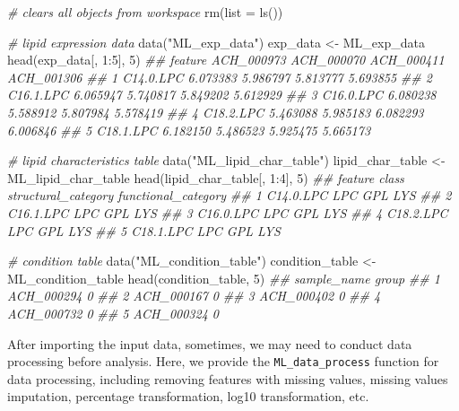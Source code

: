 \documentclass[]{article}
\newcommand{\hlnum}[1]{\textcolor[rgb]{0.816,0.125,0.439}{#1}}%
\newcommand{\hlstr}[1]{\textcolor[rgb]{0.251,0.627,0.251}{#1}}%
\newcommand{\hlcom}[1]{\textcolor[rgb]{0.502,0.502,0.502}{\textit{#1}}}%
\newcommand{\hlopt}[1]{\textcolor[rgb]{0,0,0}{#1}}%
\newcommand{\hlstd}[1]{\textcolor[rgb]{0.251,0.251,0.251}{#1}}%
\newcommand{\hlkwc}[1]{\textcolor[rgb]{0.251,0.251,0.251}{#1}}%
\newcommand{\hlkwd}[1]{\textcolor[rgb]{0.878,0.439,0.125}{#1}}%
\newenvironment{Shaded}{\begin{myshaded}}{\end{myshaded}}
\newcommand{\KeywordTok}[1]{\hlkwd{#1}}
\newcommand{\DataTypeTok}[1]{\hlkwc{#1}}
\newcommand{\DecValTok}[1]{\hlnum{#1}}
\newcommand{\StringTok}[1]{\hlstr{#1}}
\newcommand{\CommentTok}[1]{\hlcom{#1}}
\newcommand{\OperatorTok}[1]{\hlopt{#1}}
\newcommand{\NormalTok}[1]{\hlstd{#1}}
\begin{document}
\begin{Shaded}
\begin{Highlighting}[]
\CommentTok{# clears all objects from workspace}
\KeywordTok{rm}\NormalTok{(}\DataTypeTok{list =} \KeywordTok{ls}\NormalTok{())}

\CommentTok{# lipid expression data}
\KeywordTok{data}\NormalTok{(}\StringTok{"ML_exp_data"}\NormalTok{)}
\NormalTok{exp_data <-}\StringTok{ }\NormalTok{ML_exp_data}
\KeywordTok{head}\NormalTok{(exp_data[, }\DecValTok{1}\OperatorTok{:}\DecValTok{5}\NormalTok{], }\DecValTok{5}\NormalTok{)}
\CommentTok{##     feature ACH_000973 ACH_000070 ACH_000411 ACH_001306}
\CommentTok{## 1 C14.0.LPC   6.073383   5.986797   5.813777   5.693855}
\CommentTok{## 2 C16.1.LPC   6.065947   5.740817   5.849202   5.612929}
\CommentTok{## 3 C16.0.LPC   6.080238   5.588912   5.807984   5.578419}
\CommentTok{## 4 C18.2.LPC   5.463088   5.985183   6.082293   6.006846}
\CommentTok{## 5 C18.1.LPC   6.182150   5.486523   5.925475   5.665173}

\CommentTok{# lipid characteristics table}
\KeywordTok{data}\NormalTok{(}\StringTok{"ML_lipid_char_table"}\NormalTok{)}
\NormalTok{lipid_char_table <-}\StringTok{ }\NormalTok{ML_lipid_char_table}
\KeywordTok{head}\NormalTok{(lipid_char_table[, }\DecValTok{1}\OperatorTok{:}\DecValTok{4}\NormalTok{], }\DecValTok{5}\NormalTok{)}
\CommentTok{##     feature class structural_category functional_category}
\CommentTok{## 1 C14.0.LPC   LPC                 GPL                 LYS}
\CommentTok{## 2 C16.1.LPC   LPC                 GPL                 LYS}
\CommentTok{## 3 C16.0.LPC   LPC                 GPL                 LYS}
\CommentTok{## 4 C18.2.LPC   LPC                 GPL                 LYS}
\CommentTok{## 5 C18.1.LPC   LPC                 GPL                 LYS}

\CommentTok{# condition table}
\KeywordTok{data}\NormalTok{(}\StringTok{"ML_condition_table"}\NormalTok{)}
\NormalTok{condition_table <-}\StringTok{ }\NormalTok{ML_condition_table}
\KeywordTok{head}\NormalTok{(condition_table, }\DecValTok{5}\NormalTok{)}
\CommentTok{##   sample_name group}
\CommentTok{## 1  ACH_000294     0}
\CommentTok{## 2  ACH_000167     0}
\CommentTok{## 3  ACH_000402     0}
\CommentTok{## 4  ACH_000732     0}
\CommentTok{## 5  ACH_000324     0}
\end{Highlighting}
\end{Shaded}

After importing the input data, sometimes, we may need to conduct data processing before analysis. Here, we provide the \texttt{ML\_data\_process} function for data processing, including removing features with missing values, missing values imputation, percentage transformation, log10 transformation, etc.
\end{document}
